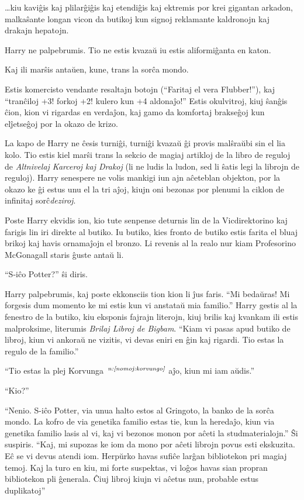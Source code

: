 \ldots kiu kaviĝis kaj plilarĝiĝis kaj etendiĝis kaj ektremis por
krei gigantan arkadon, malkaŝante longan vicon da butikoj kun signoj
reklamante kaldronojn kaj drakajn hepatojn.

Harry ne palpebrumis. Tio ne estis kvazaŭ iu estis aliformiĝanta en
katon.

Kaj ili marŝis antaŭen, kune, trans la sorĉa mondo.

Estis komercisto vendante resaltajn botojn (``Faritaj el vera
Flubber!''), kaj ``tranĉiloj +3! forkoj +2! kulero kun +4 aldonaĵo!''
Estis okulvitroj, kiuj ŝanĝis ĉion, kion vi rigardas en verdaĵon, kaj
gamo da komfortaj brakseĝoj kun elĵetseĝoj por la okazo de krizo.

La kapo de Harry ne ĉesis turniĝi, turniĝi kvazaŭ ĝi provis malŝraŭbi
sin el lia kolo. Tio estis kiel marŝi trans la sekcio de magiaj
artikloj de la libro de reguloj de \emph{Altnivelaj Karceroj kaj
Drakoj} (li ne ludis la ludon, sed li ŝatis legi la librojn de
reguloj). Harry senespere ne volis mankigi iun ajn aĉeteblan objekton,
por la okazo ke ĝi estus unu el la tri aĵoj, kiujn oni bezonas por
plenumi la ciklon de infinitaj sorĉ\emph{deziroj}.

Poste Harry ekvidis ion, kio tute senpense deturnis lin de la
Vicdirektorino kaj farigis lin iri direkte al butiko. Iu butiko, kies
fronto de butiko estis farita el bluaj brikoj kaj havis ornamaĵojn el
bronzo. Li revenis al la realo nur kiam Profesorino McGonagall
staris ĝuste antaŭ li.

``S-iĉo Potter?'' ŝi diris.

Harry palpebrumis, kaj poste ekkonsciis tion kion li ĵus faris. ``Mi
bedaŭras! Mi forgesis dum momento ke mi estis kun vi anstataŭ mia
familio.'' Harry gestis al la fenestro de la butiko, kiu eksponis
fajrajn literojn, kiuj brilis kaj kvankam ili estis malproksime,
literumis \emph{Brilaj Libroj de Bigbam}. ``Kiam vi pasas apud butiko
de libroj, kiun vi ankoraŭ ne vizitis, vi devas eniri en ĝin kaj
rigardi. Tio estas la regulo de la familio.''

``Tio estas la plej Korvunga~$^{\textit{n:\ref{nomoj:korvungo}}}$ aĵo, kiun mi iam aŭdis.''

``Kio?''

``Nenio. S-iĉo Potter, via unua halto estos al Gringoto, la banko de la
sorĉa mondo. La kofro de via genetika familio estas tie, kun la
heredaĵo, kiun via genetika familio lasis al vi, kaj vi bezonos monon
por aĉeti la studmaterialojn.'' Ŝi suspiris. ``Kaj, mi supozas ke iom
da mono por aĉeti librojn povus esti ekskuzita. Eĉ se vi devus atendi
iom. Herpŭrko havas sufiĉe larĝan bibliotekon pri magiaj
temoj. Kaj la turo en kiu, mi forte suspektas, vi loĝos havas sian
propran bibliotekon pli ĝenerala. Ĉiuj libroj kiujn vi aĉetus nun,
probable estus duplikatoj''


